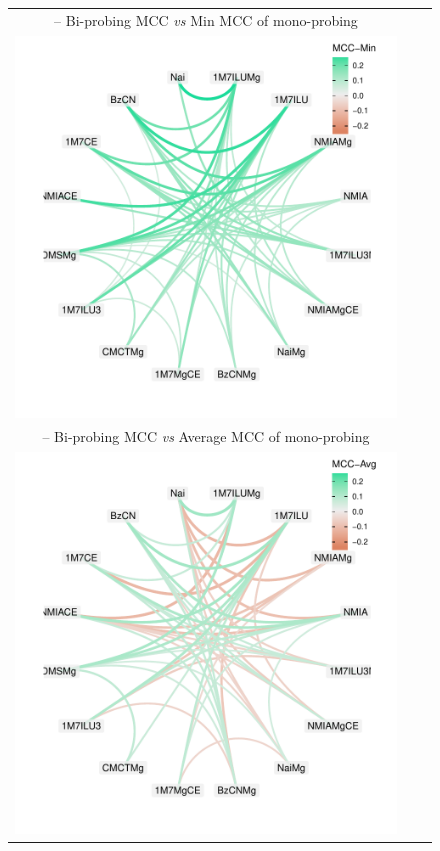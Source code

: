 \documentclass[a4,center,fleqn]{NAR}
\begin{document}
\begin{figure}
	\newcommand{\W}{.73}
	{\centering\begin{tabular}{@{}c@{}c@{}c@{}}
			{\sf {\bfseries A} -- \relsize{-1}Bi-probing MCC \emph{vs} Min MCC of mono-probing}\\
			\includegraphics[width=\W\linewidth,trim=1cm 1cm .8cm .3cm,clip]{graphs/didy/MCC-vs-Min}\\[.5em]
			{\sf {\bfseries B} -- \relsize{-1}Bi-probing MCC \emph{vs} Average MCC of mono-probing}\\
			\includegraphics[width=\W\linewidth,trim=1cm 1cm .8cm .3cm,clip]{graphs/didy/MCC-vs-Avg}\\[.5em]

\end{tabular}}
\end{figure}
\end{document}
